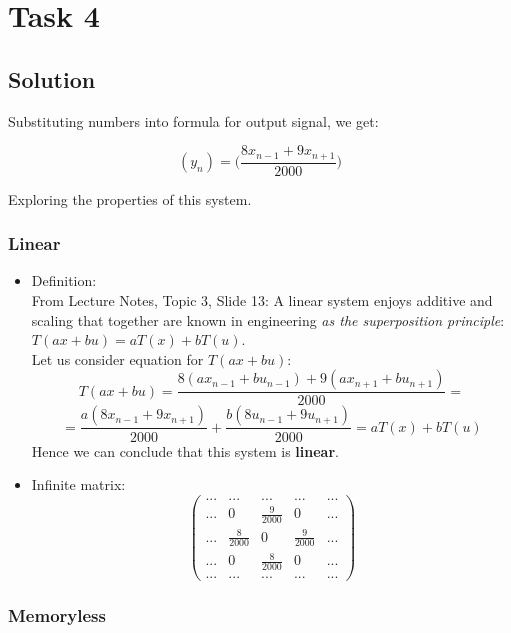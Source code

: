 \documentclass[12pt,a4paper]{article}
\begin{document}
     
    
\section{Task 4}
\subsection{Solution}

Substituting numbers into formula for output signal, we get:

$$(y_n)=\Big(\frac{8x_{n-1}+9x_{n+1}}{2000}\Big)$$

Exploring the properties of this system. 

\subsubsection{Linear}
    
    \begin{itemize}
        \item Definition: \\
        From Lecture Notes, Topic 3, Slide 13: A linear system enjoys additive and scaling that together are known in engineering \emph{as the superposition principle}: $T(ax+bu)=aT(x)+bT(u)$. \\

Let us consider equation for $T(ax+bu)$:
    $$T(ax+bu)=\frac{8(ax_{n-1}+bu_{n-1})+9(ax_{n+1}+bu_{n+1})}{2000}=$$$$=\frac{a(8x_{n-1}+9x_{n+1})}{2000}+\frac{b(8u_{n-1}+9u_{n+1})}{2000}=aT(x)+bT(u)$$
    Hence we can conclude that this system is \textbf{linear}.
    
    \item   Infinite matrix:
    $$\begin{pmatrix}
    ... & ... & ... & ... & ...\\
    ... & 0 & \frac{9}{2000} & 0 & ...\\
    ... & \frac{8}{2000} & 0 & \frac{9}{2000} & ...\\
    ... & 0 & \frac{8}{2000} & 0 & ...\\
    ... & ... & ... & ... & ...
    \end{pmatrix}$$
    
    \end{itemize}
 
 \subsubsection{Memoryless}
    
\end{document}
